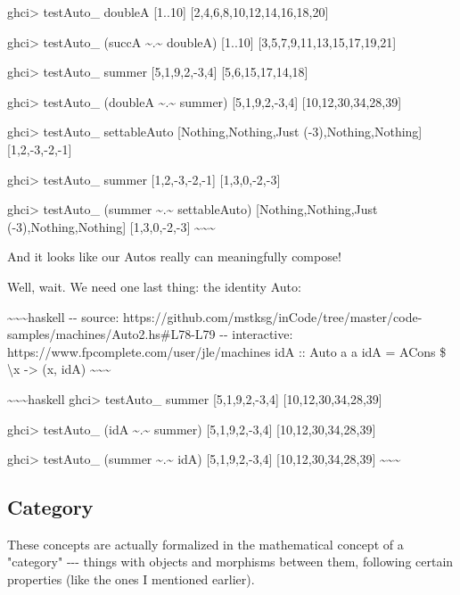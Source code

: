 \documentclass[]{article}
\begin{document}
ghci\textgreater{} testAuto\_ doubleA {[}1..10{]}
{[}2,4,6,8,10,12,14,16,18,20{]}

ghci\textgreater{} testAuto\_ (succA \textasciitilde{}.\textasciitilde{}
doubleA) {[}1..10{]} {[}3,5,7,9,11,13,15,17,19,21{]}

ghci\textgreater{} testAuto\_ summer {[}5,1,9,2,-3,4{]} {[}5,6,15,17,14,18{]}

ghci\textgreater{} testAuto\_ (doubleA \textasciitilde{}.\textasciitilde{}
summer) {[}5,1,9,2,-3,4{]} {[}10,12,30,34,28,39{]}

ghci\textgreater{} testAuto\_ settableAuto {[}Nothing,Nothing,Just
(-3),Nothing,Nothing{]} {[}1,2,-3,-2,-1{]}

ghci\textgreater{} testAuto\_ summer {[}1,2,-3,-2,-1{]} {[}1,3,0,-2,-3{]}

ghci\textgreater{} testAuto\_ (summer \textasciitilde{}.\textasciitilde{}
settableAuto) \textbar{} {[}Nothing,Nothing,Just (-3),Nothing,Nothing{]}
{[}1,3,0,-2,-3{]} \textasciitilde{}\textasciitilde{}\textasciitilde{}

And it looks like our Autos really can meaningfully compose!

Well, wait. We need one last thing: the identity Auto:

\textasciitilde{}\textasciitilde{}\textasciitilde{}haskell -\/- source:
https://github.com/mstksg/inCode/tree/master/code-samples/machines/Auto2.hs\#L78-L79
-\/- interactive: https://www.fpcomplete.com/user/jle/machines idA :: Auto a a
idA = ACons \$ \textbackslash{}x -\textgreater{} (x, idA)
\textasciitilde{}\textasciitilde{}\textasciitilde{}

\textasciitilde{}\textasciitilde{}\textasciitilde{}haskell ghci\textgreater{}
testAuto\_ summer {[}5,1,9,2,-3,4{]} {[}10,12,30,34,28,39{]}

ghci\textgreater{} testAuto\_ (idA \textasciitilde{}.\textasciitilde{} summer)
{[}5,1,9,2,-3,4{]} {[}10,12,30,34,28,39{]}

ghci\textgreater{} testAuto\_ (summer \textasciitilde{}.\textasciitilde{} idA)
{[}5,1,9,2,-3,4{]} {[}10,12,30,34,28,39{]}
\textasciitilde{}\textasciitilde{}\textasciitilde{}

\subsection{Category}

These concepts are actually formalized in the mathematical concept of a
"category" -\/-\/- things with objects and morphisms between them, following
certain properties (like the ones I mentioned earlier).
\end{document}
